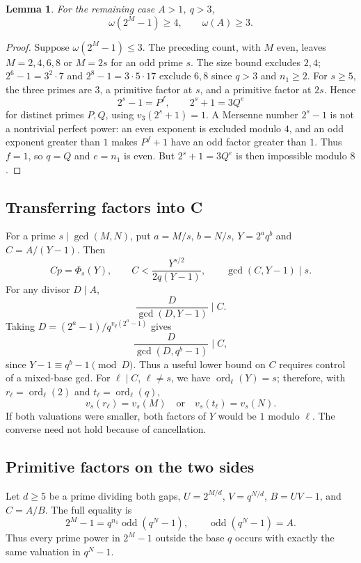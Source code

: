 \documentclass[11pt]{article}
\newtheorem{lemma}{Lemma}
\begin{document}
\begin{lemma}
For the remaining case $A>1$, $q>3$,
\[
\omega(2^M-1)\geq4,\qquad\omega(A)\geq3.
\]
\end{lemma}
\begin{proof}
Suppose $\omega(2^M-1)\leq3$. The preceding count, with $M$ even,
leaves $M=2,4,6,8$ or $M=2s$ for an odd prime $s$.
The size bound excludes $2,4$; $2^6-1=3^2\cdot7$ and
$2^8-1=3\cdot5\cdot17$ exclude $6,8$ since $q>3$ and $n_1\geq2$.
For $s\geq5$, the three primes are $3$, a primitive factor at $s$,
and a primitive factor at $2s$. Hence
\[
2^s-1=P^f,\qquad2^s+1=3Q^e
\]
for distinct primes $P,Q$, using $v_3(2^s+1)=1$.
A Mersenne number $2^s-1$ is not a nontrivial perfect power:
an even exponent is excluded modulo $4$, and an odd exponent greater
than $1$ makes $P^f+1$ have an odd factor greater than $1$.
Thus $f=1$, so $q=Q$ and $e=n_1$ is even.
But $2^s+1=3Q^e$ is then impossible modulo $8$.
\end{proof}

\subsection{Transferring factors into C}
For a prime $s\mid\gcd(M,N)$, put $a=M/s$, $b=N/s$,
$Y=2^a q^b$ and $C=A/(Y-1)$. Then
\[
Cp=\Phi_s(Y),\qquad C<\frac{Y^{s/2}}{2q(Y-1)},\qquad
\gcd(C,Y-1)\mid s.
\]
For any divisor $D\mid A$,
\[
\frac{D}{\gcd(D,Y-1)}\mid C.
\]
Taking $D=(2^a-1)/q^{v_q(2^a-1)}$ gives
\[
\boxed{\frac{D}{\gcd(D,q^b-1)}\mid C,}
\]
since $Y-1\equiv q^b-1\pmod D$.
Thus a useful lower bound on $C$ requires control of a mixed-base gcd.
For $\ell\mid C$, $\ell\neq s$, we have $\operatorname{ord}_\ell(Y)=s$;
therefore, with $r_\ell=\operatorname{ord}_\ell(2)$ and
$t_\ell=\operatorname{ord}_\ell(q)$,
\[
v_s(r_\ell)=v_s(M)\quad\text{or}\quad v_s(t_\ell)=v_s(N).
\]
If both valuations were smaller, both factors of $Y$ would be $1$
modulo $\ell$. The converse need not hold because of cancellation.

\subsection{Primitive factors on the two sides}
Let $d\ge5$ be a prime dividing both gaps, $U=2^{M/d}$,
$V=q^{N/d}$, $B=UV-1$, and $C=A/B$. The full equality is
\[
2^M-1=q^{n_1}\operatorname{odd}(q^N-1),\qquad
\operatorname{odd}(q^N-1)=A.
\]
Thus every prime power in $2^M-1$ outside the base $q$ occurs
with exactly the same valuation in $q^N-1$.
\end{document}
